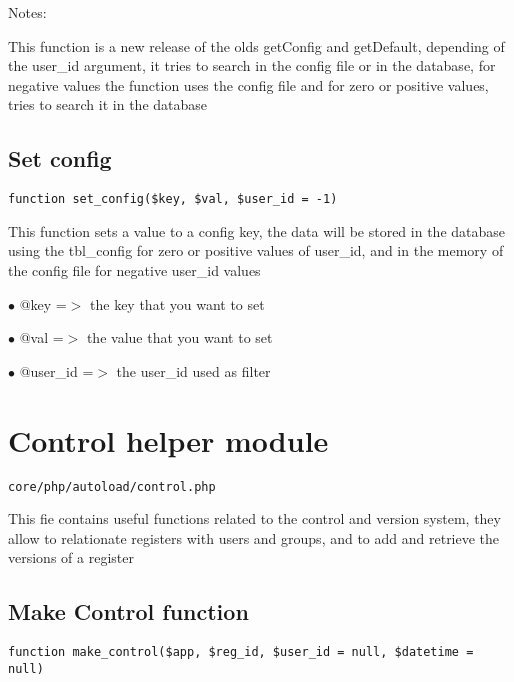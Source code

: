 \documentclass[a4paper]{book}
\begin{document}
Notes:

This function is a new release of the olds getConfig and getDefault,
depending of the user\_id argument, it tries to search in the config
file or in the database, for negative values the function uses the
config file and for zero or positive values, tries to search it in
the database

\hypertarget{toc52}{}
\subsection{Set config}

\begin{lstlisting}
function set_config($key, $val, $user_id = -1)
\end{lstlisting}

This function sets a value to a config key, the data will be stored in the
database using the tbl\_config for zero or positive values of user\_id, and
in the memory of the config file for negative user\_id values

\begin{compactitem}
\item[\color{myblue}$\bullet$] @key     =$>$ the key that you want to set
\item[\color{myblue}$\bullet$] @val     =$>$ the value that you want to set
\item[\color{myblue}$\bullet$] @user\_id =$>$ the user\_id used as filter
\end{compactitem}

\hypertarget{toc53}{}
\section{Control helper module}

\begin{lstlisting}
core/php/autoload/control.php
\end{lstlisting}

This fie contains useful functions related to the control and version system, they allow to
relationate registers with users and groups, and to add and retrieve the versions of a register

\hypertarget{toc54}{}
\subsection{Make Control function}

\begin{lstlisting}
function make_control($app, $reg_id, $user_id = null, $datetime = null)
\end{lstlisting}
\end{document}

